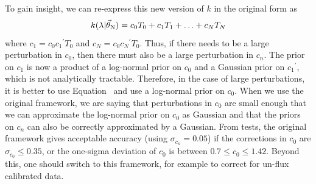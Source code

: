\documentclass[preprint]{aastex} %
\newcommand{\vt}{\vec{\theta}}
\newcommand{\vN}{\vt_{\rm N}}
\begin{document}
To gain insight, we can re-express this new version of $k$ in the original form as 
\begin{equation}
   k(\lambda | \vN) = c_0 T_0 + c_1 T_1 + \ldots + c_N T_N
\end{equation}
where $c_1 = c_0 {c_1}^\prime T_0$ and $c_N = c_0 {c_N}^\prime T_0$. Thus, if there needs to be a large perturbation in $c_0$, then there must also be a large perturbation in $c_n$. The prior on $c_1$ is now a product of a log-normal prior on $c_0$ and a Gaussian prior on ${c_1}^\prime$, which is not analytically tractable. Therefore, in the case of large perturbations, it is better to use Equation~ and use a log-normal prior on $c_0$. When we use the original framework, we are saying that perturbations in $c_0$ are small enough that we can approximate the log-normal prior on $c_0$ as Gaussian and that the priors on $c_n$ can also be correctly approximated by a Gaussian. From tests, the original framework gives acceptable accuracy (using $\sigma_{c_n} = 0.05$) if the corrections in $c_0$ are $\sigma_{c_0} \leq 0.35$, or the one-sigma deviation of $c_0$ is between $0.7 \leq c_0 \leq 1.42$. Beyond this, one should switch to this framework, for example to correct for un-flux calibrated data.




\end{document}
